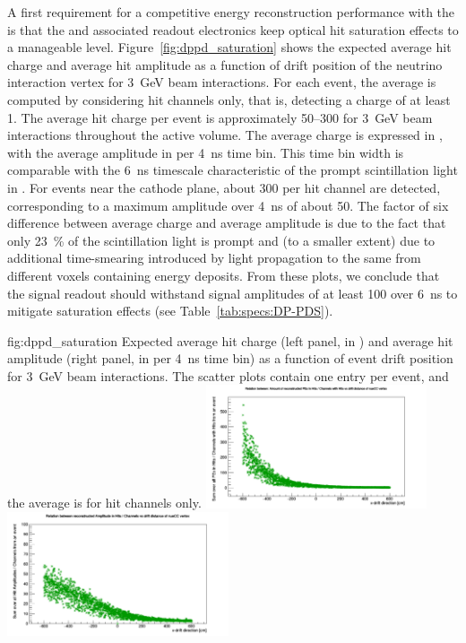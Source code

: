A first requirement for a competitive energy reconstruction performance with the  is that the  and associated readout electronics keep optical hit saturation effects to a manageable level. Figure~\ref{fig:dppd_saturation} shows the expected average hit charge and average hit amplitude as a function of drift position of the neutrino interaction vertex for \SI{3}{\GeV} beam \nue {} interactions. For each event, the average is computed by considering hit  channels only, that is,  detecting a charge of at least \SI{1}{}. The average hit charge per event is approximately \SIrange{50}{300}{} for \SI{3}{\GeV} beam \nue {} interactions throughout the  active volume. The average charge is expressed in , with the average amplitude in  per \SI{4}{\nano\s} time bin. This time bin width is comparable with the \SI{6}{\nano\s} timescale characteristic of the prompt scintillation light in . For events near the cathode plane, about \SI{300}{} per hit channel are detected, corresponding to a maximum amplitude over \SI{4}{\nano\s} of about \SI{50}{}. The factor of six difference between average charge and average amplitude is due to the fact that only \SI{23}{\%} of the scintillation light is prompt and (to a smaller extent) due to additional time-smearing introduced by light propagation to the same  from different  voxels containing energy deposits. From these plots, we conclude that the  signal readout should withstand signal amplitudes of at least \SI{100}{} over \SI{6}{\nano\s} to mitigate saturation effects (see Table~\ref{tab:specs:DP-PDS}).

\begin{dunefigure}{fig:dppd_saturation}
{Expected average hit charge (left panel, in ) and average hit amplitude (right panel, in  per \SI{4}{\nano\s} time bin) as a function of event drift position for \SI{3}{\GeV} beam \nue {} interactions. The scatter plots  contain one entry per event, and the average is for hit  channels only.}
\includegraphics[trim=0cm 0cm 0cm 1.cm, clip, width=0.49\textwidth]{graphics/dppd_avg_charge_per_channel.pdf} \hfill
\includegraphics[trim=0cm 0cm 0cm 1.cm, clip, width=0.49\textwidth]{graphics/dppd_avg_amplitude_per_channel.pdf}
\end{dunefigure}

